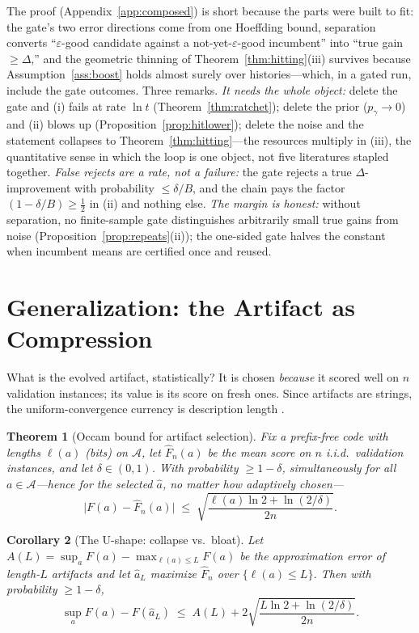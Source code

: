 \documentclass{article}
\theoremstyle{plain}
\newtheorem{theorem}{Theorem}[section]
\newtheorem{corollary}[theorem]{Corollary}
\theoremstyle{definition}
\theoremstyle{remark}
\newcommand{\A}{\mathcal{A}}
\newcommand{\len}{\ell}
\newcommand{\Fhat}{\widehat{F}}
\newcommand{\eps}{\varepsilon}
\newcommand{\pgam}{p_{\gamma}}
\begin{document}
The proof (Appendix~\ref{app:composed}) is short because the parts were built to fit: the gate's two error directions come from one Hoeffding bound, separation converts ``$\eps$-good candidate against a not-yet-$\eps$-good incumbent'' into ``true gain $\ge \Delta$,'' and the geometric thinning of Theorem~\ref{thm:hitting}(iii) survives because Assumption~\ref{ass:boost} holds almost surely over histories---which, in a gated run, include the gate outcomes. Three remarks. \emph{It needs the whole object:} delete the gate and (i) fails at rate $\ln t$ (Theorem~\ref{thm:ratchet}); delete the prior ($\pgam \to 0$) and (ii) blows up (Proposition~\ref{prop:hitlower}); delete the noise and the statement collapses to Theorem~\ref{thm:hitting}---the resources multiply in (iii), the quantitative sense in which the loop is one object, not five literatures stapled together. \emph{False rejects are a rate, not a failure:} the gate rejects a true $\Delta$-improvement with probability $\le \delta/B$, and the chain pays the factor $(1-\delta/B) \ge \tfrac12$ in (ii) and nothing else. \emph{The margin is honest:} without separation, no finite-sample gate distinguishes arbitrarily small true gains from noise (Proposition~\ref{prop:repeats}(ii)); the one-sided gate halves the constant when incumbent means are certified once and reused.

\section{Generalization: the Artifact as Compression}
\label{sec:compression}

What is the evolved artifact, statistically? It is chosen \emph{because} it scored well on $n$ validation instances; its value is its score on fresh ones. Since artifacts are strings, the uniform-convergence currency is description length \citep{rissanen1978modeling, mcallester1999pac}.

\begin{theorem}[Occam bound for artifact selection]
\label{thm:occam}
Fix a prefix-free code with lengths $\len(a)$ (bits) on $\A$, let $\Fhat_n(a)$ be the mean score on $n$ i.i.d.\ validation instances, and let $\delta \in (0,1)$. With probability $\ge 1 - \delta$, simultaneously for \emph{all} $a \in \A$---hence for the selected $\hat{a}$, no matter how adaptively chosen---
\[
\big|F(a) - \Fhat_n(a)\big| \;\le\; \sqrt{\frac{\len(a) \ln 2 + \ln(2/\delta)}{2n}}.
\]
\end{theorem}

\begin{corollary}[The U-shape: collapse vs.\ bloat]
\label{cor:ushape}
Let $A(L) = \sup_a F(a) - \max_{\len(a) \le L} F(a)$ be the approximation error of length-$L$ artifacts and let $\hat{a}_L$ maximize $\Fhat_n$ over $\{\len(a) \le L\}$. Then with probability $\ge 1-\delta$,
\[
\sup_a F(a) - F(\hat{a}_L) \;\le\; A(L) + 2\sqrt{\frac{L \ln 2 + \ln(2/\delta)}{2n}} .
\]
\end{corollary}
\end{document}

